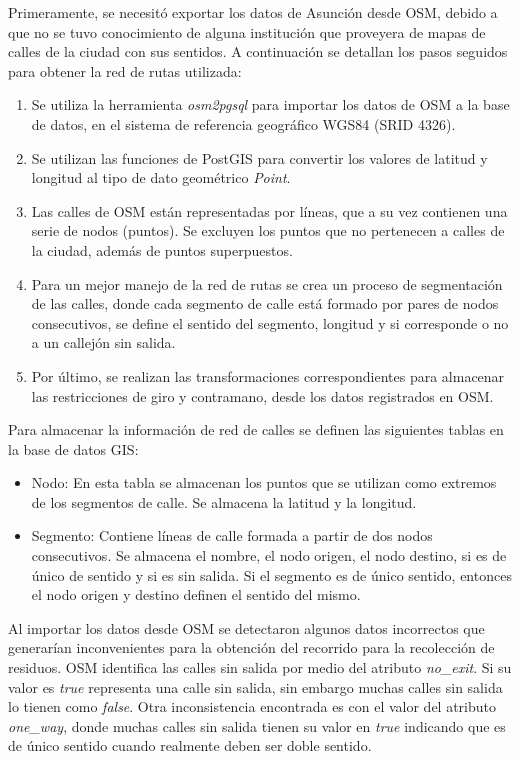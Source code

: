 Primeramente, se necesitó exportar los datos de Asunción desde OSM, debido a que no se tuvo conocimiento de alguna institución que proveyera de mapas de calles de la ciudad con sus sentidos. A continuación se detallan los pasos seguidos para obtener la red de rutas utilizada: 
\begin{enumerate}
    \item Se utiliza la herramienta \textit{osm2pgsql} para importar los datos de OSM a la base de datos, en el sistema de referencia geográfico WGS84 (SRID 4326). 
    \item Se utilizan las funciones de PostGIS para convertir los valores de latitud y longitud al tipo de dato geométrico \textit{Point}. 
    \item Las calles de OSM están representadas por líneas, que a su vez contienen una serie de nodos (puntos). Se excluyen los puntos que no pertenecen a calles de la ciudad, además de puntos superpuestos.
    \item Para un mejor manejo de la red de rutas se crea un proceso de segmentación de las calles, donde cada segmento de calle está formado por pares de nodos consecutivos, se define el sentido del segmento, longitud y si corresponde o no a un callejón sin salida.
    \item Por último, se realizan las transformaciones correspondientes para almacenar las restricciones de giro y contramano, desde los datos registrados en OSM.
\end{enumerate}

Para almacenar la información de red de calles se definen las siguientes tablas en la base de datos GIS:

\begin{itemize}
    \item Nodo: En esta tabla se almacenan los puntos que se utilizan como extremos de los segmentos de calle. Se almacena la latitud y la longitud.
    \item Segmento: Contiene líneas de calle formada a partir de dos nodos consecutivos. Se almacena el nombre, el nodo origen, el nodo destino, si es de único de sentido y si es sin salida. Si el segmento es de único sentido, entonces el nodo origen y destino definen el sentido del mismo.
\end{itemize}

Al importar los datos desde OSM se detectaron algunos datos incorrectos que generarían inconvenientes para la obtención del recorrido para la recolección de residuos. OSM identifica las calles sin salida por medio del atributo \textit{no\_exit}. Si su valor es \textit{true} representa una calle sin salida, sin embargo muchas calles sin salida lo tienen como \textit{false}. Otra inconsistencia encontrada es con el valor del atributo \textit{one\_way}, donde muchas calles sin salida tienen su valor en \textit{true} indicando que es de único sentido cuando realmente deben ser doble sentido.

